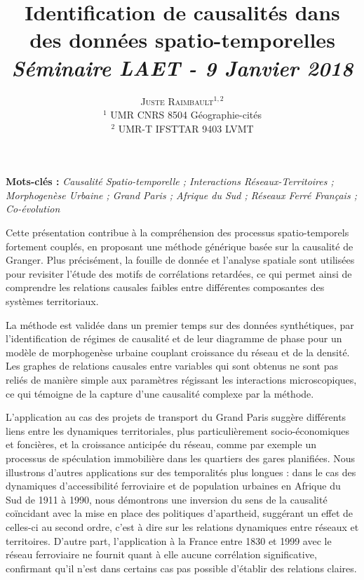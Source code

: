 \documentclass[11pt]{article}
\newcommand{\noun}[1]{\textsc{#1}}
\begin{document}
\title{Identification de causalités dans des données spatio-temporelles
\bigskip\\
\textit{Séminaire LAET - 9 Janvier 2018}
}
\author{\noun{Juste Raimbault}$^{1,2}$\medskip\\
$^1$ UMR CNRS 8504 Géographie-cités\\
$^2$ UMR-T IFSTTAR 9403 LVMT
}
\date{}

\maketitle

\justify



\textbf{Mots-clés : }\textit{Causalité Spatio-temporelle ; Interactions Réseaux-Territoires ; Morphogenèse Urbaine ; Grand Paris ; Afrique du Sud ; Réseaux Ferré Français ; Co-évolution}

\bigskip

Cette présentation contribue à la compréhension des processus spatio-temporels fortement couplés, en proposant une méthode générique basée sur la causalité de Granger. Plus précisément, la fouille de donnée et l'analyse spatiale sont utilisées pour revisiter l'étude des motifs de corrélations retardées, ce qui permet ainsi de comprendre les relations causales faibles entre différentes composantes des systèmes territoriaux.

La méthode est validée dans un premier temps sur des données synthétiques, par l'identification de régimes de causalité et de leur diagramme de phase pour un modèle de morphogenèse urbaine couplant croissance du réseau et de la densité. Les graphes de relations causales entre variables qui sont obtenus ne sont pas reliés de manière simple aux paramètres régissant les interactions microscopiques, ce qui témoigne de la capture d'une causalité complexe par la méthode.

L'application au cas des projets de transport du Grand Paris suggère différents liens entre les dynamiques territoriales, plus particulièrement socio-économiques et foncières, et la croissance anticipée du réseau, comme par exemple un processus de spéculation immobilière dans les quartiers des gares planifiées. Nous illustrons d'autres applications sur des temporalités plus longues : dans le cas des dynamiques d'accessibilité ferroviaire et de population urbaines en Afrique du Sud de 1911 à 1990, nous démontrons une inversion du sens de la causalité coïncidant avec la mise en place des politiques d'apartheid, suggérant un effet de celles-ci au second ordre, c'est à dire sur les relations dynamiques entre réseaux et territoires. D'autre part, l'application à la France entre 1830 et 1999 avec le réseau ferroviaire ne fournit quant à elle aucune corrélation significative, confirmant qu'il n'est dans certains cas pas possible d'établir des relations claires.
\end{document}
